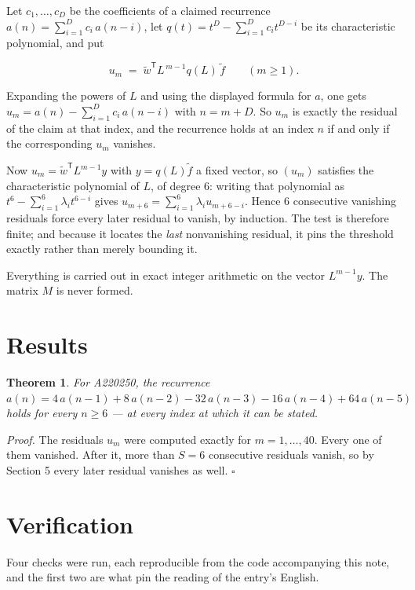\documentclass[11pt]{article}
\newtheorem{theorem}{Theorem}
\theoremstyle{definition}
\begin{document}
Let $c_1,\dots,c_D$ be the coefficients of a claimed recurrence $a(n) = \sum_{i=1}^{D} c_i\,a(n-i)$, let $q(t) = t^{D} - \sum_{i=1}^{D} c_i t^{D-i}$ be its characteristic polynomial, and put

\[u_m \;=\; \tilde w^{\mathsf T} L^{\,m-1} q(L)\,\tilde f \qquad (m \ge 1).\]

Expanding the powers of $L$ and using the displayed formula for $a$, one gets $u_m = a(n) - \sum_{i=1}^{D} c_i\,a(n-i)$ with $n = m + D$. So $u_m$ is exactly the residual of the claim at that index, and the recurrence holds at an index $n$ if and only if the corresponding $u_m$ vanishes.

Now $u_m = \tilde w^{\mathsf T} L^{m-1} y$ with $y = q(L)\tilde f$ a fixed vector, so $(u_m)$ satisfies the characteristic polynomial of $L$, of degree $6$: writing that polynomial as $t^{6} - \sum_{i=1}^{6} \lambda_i t^{6-i}$ gives $u_{m+6} = \sum_{i=1}^{6} \lambda_i u_{m+6-i}$. Hence $6$ consecutive vanishing residuals force every later residual to vanish, by induction. The test is therefore finite; and because it locates the {\itshape last} nonvanishing residual, it pins the threshold exactly rather than merely bounding it.

Everything is carried out in exact integer arithmetic on the vector $L^{m-1}y$. The matrix $M$ is never formed.

\section{Results}

\begin{theorem} For A220250, the recurrence $a(n) = 4\,a(n-1) + 8\,a(n-2) - 32\,a(n-3) - 16\,a(n-4) + 64\,a(n-5)$ holds for every $n \ge 6$ --- at every index at which it can be stated.\end{theorem}

{\itshape Proof.} The residuals $u_m$ were computed exactly for $m = 1,\dots,40$. Every one of them vanished. After it, more than $S = 6$ consecutive residuals vanish, so by Section 5 every later residual vanishes as well. $\square$

\section{Verification}

Four checks were run, each reproducible from the code accompanying this note, and the first two are what pin the reading of the entry's English.
\end{document}
